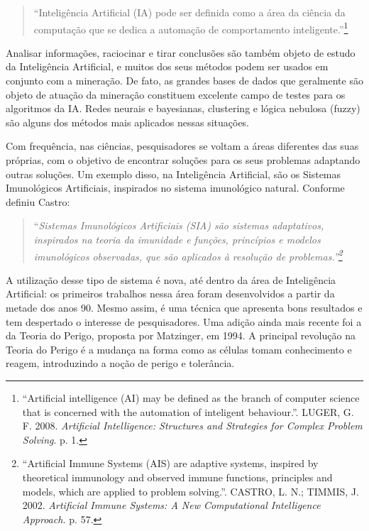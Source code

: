 \documentclass{iiufrgs}
\begin{document}
\begin{quote}
``Inteligência Artificial (IA) pode ser definida como a área da ciência da computação que se dedica a automação de comportamento inteligente.''\footnote{``Artificial intelligence (AI) may be defined as the branch of computer science that is concerned with the automation of inteligent behaviour.''. LUGER, G. F. 2008. \emph{Artificial Intelligence: Structures and Strategies for Complex Problem Solving}. p. 1.}
\end{quote}

Analisar informações, raciocinar e tirar conclusões são também objeto de estudo da Inteligência Artificial, e muitos dos seus métodos podem ser usados em conjunto com a mineração. De fato, as grandes bases de dados que geralmente são objeto de atuação da mineração constituem excelente campo de testes para os algoritmos da IA. Redes neurais e bayesianas, clustering e lógica nebulosa (fuzzy) são alguns dos métodos mais aplicados nessas situações.

Com frequência, nas ciências, pesquisadores se voltam a áreas diferentes das suas próprias, com o objetivo de encontrar soluções para os seus problemas adaptando outras soluções. Um exemplo disso, na Inteligência Artificial, são os Sistemas Imunológicos Artificiais, inspirados no sistema imunológico natural. Conforme definiu Castro:

\begin{quote}
``\emph{Sistemas Imunológicos Artificiais (SIA) são sistemas adaptativos, inspirados na teoria da imunidade e funções, princípios e modelos imunológicos observadas, que são aplicados à resolução de problemas.''\footnote{``Artificial Immune Systems (AIS) are adaptive systems, inspired by theoretical immunology and observed immune functions, principles and models, which are applied to problem solving.''. CASTRO, L. N.; TIMMIS, J. 2002. \emph{Artificial Immune Systems: A New Computational Intelligence Approach.} p. 57.}}
\end{quote}

A utilização desse tipo de sistema é nova, até dentro da área de Inteligência Artificial: os primeiros trabalhos nessa área foram desenvolvidos a partir da metade dos anos 90. Mesmo assim, é uma técnica que apresenta bons resultados e tem despertado o interesse de pesquisadores. Uma adição ainda mais recente foi a da Teoria do Perigo, proposta por Matzinger, em 1994. A principal revolução na Teoria do Perigo é a mudança na forma como as células tomam conhecimento e reagem, introduzindo a noção de perigo e tolerância.
\end{document}
